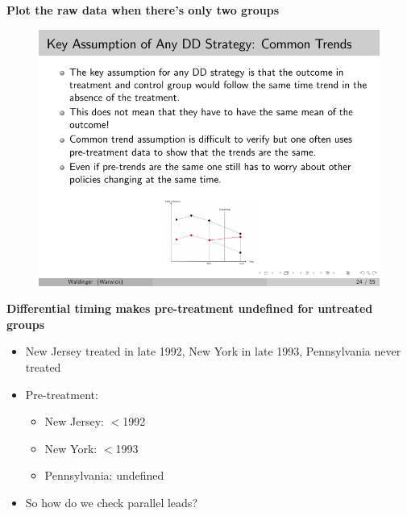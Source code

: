\documentclass[notes=show]{beamer}
\begin{document}
\begin{frame}[plain]
\begin{center}
\textbf{Plot the raw data when there's only two groups}
\end{center}

	\begin{figure}
	\includegraphics[scale=2.5]{./lecture_includes/waldinger_dd_6.pdf}
	\end{figure}

\end{frame}


\begin{frame}[plain]
\begin{center}
\textbf{Differential timing makes pre-treatment undefined for untreated groups}
\end{center}

\begin{itemize}
\item New Jersey treated in late 1992, New York in late 1993, Pennsylvania never treated
\item Pre-treatment:
	\begin{itemize}
	\item New Jersey: $<$1992
	\item New York: $<$1993
	\item Pennsylvania: undefined
	\end{itemize}
\item So how do we check parallel leads?

\end{itemize}

\end{frame}
\end{document}
